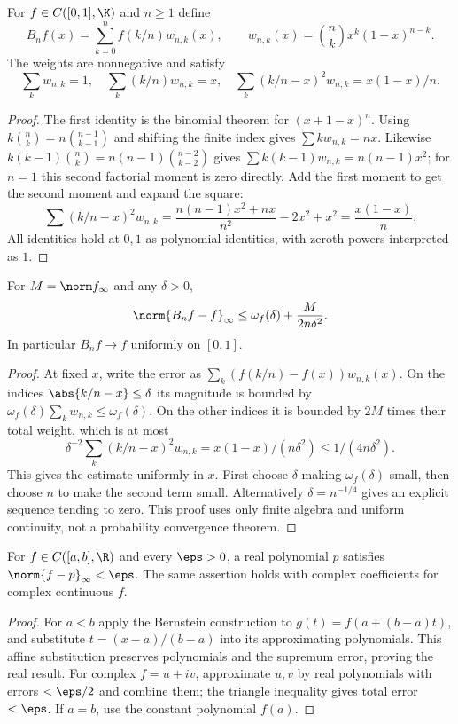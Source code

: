 \begin{construction}
For $f\in C([0,1],\K)$ and $n\geq1$ define
\[B_nf(x)=\sum_{k=0}^nf(k/n)w_{n,k}(x),\qquad w_{n,k}(x)=\binom nkx^k(1-x)^{n-k}.\]
The weights are nonnegative and satisfy
\[\sum_kw_{n,k}=1,\quad\sum_k(k/n)w_{n,k}=x,\quad\sum_k(k/n-x)^2w_{n,k}=x(1-x)/n.\]
\end{construction}
\begin{proof}
The first identity is the binomial theorem for $(x+1-x)^n$. Using $k\binom nk=n\binom{n-1}{k-1}$ and shifting the finite index gives $\sum k w_{n,k}=nx$. Likewise $k(k-1)\binom nk=n(n-1)\binom{n-2}{k-2}$ gives $\sum k(k-1)w_{n,k}=n(n-1)x^2$; for $n=1$ this second factorial moment is zero directly. Add the first moment to get the second moment and expand the square:
\[\sum(k/n-x)^2w_{n,k}=\frac{n(n-1)x^2+nx}{n^2}-2x^2+x^2=\frac{x(1-x)}n.\]
All identities hold at $0,1$ as polynomial identities, with zeroth powers interpreted as $1$.
\end{proof}

\begin{theorem}
For $M=\norm f_\infty$ and any $\delta>0$,
\[\norm{B_nf-f}_\infty\leq\omega_f(\delta)+\frac{M}{2n\delta^2}.\]
In particular $B_nf\to f$ uniformly on $[0,1]$.
\end{theorem}
\begin{proof}
At fixed $x$, write the error as $\sum_k(f(k/n)-f(x))w_{n,k}(x)$. On the indices $\abs{k/n-x}\leq\delta$ its magnitude is bounded by $\omega_f(\delta)\sum_kw_{n,k}\leq\omega_f(\delta)$. On the other indices it is bounded by $2M$ times their total weight, which is at most
\[\delta^{-2}\sum_k(k/n-x)^2w_{n,k}=x(1-x)/(n\delta^2)\leq1/(4n\delta^2).\]
This gives the estimate uniformly in $x$. First choose $\delta$ making $\omega_f(\delta)$ small, then choose $n$ to make the second term small. Alternatively $\delta=n^{-1/4}$ gives an explicit sequence tending to zero. This proof uses only finite algebra and uniform continuity, not a probability convergence theorem.
\end{proof}

\begin{theorem}
For $f\in C([a,b],\R)$ and every $\eps>0$, a real polynomial $p$ satisfies $\norm{f-p}_\infty<\eps$. The same assertion holds with complex coefficients for complex continuous $f$.
\end{theorem}
\begin{proof}
For $a<b$ apply the Bernstein construction to $g(t)=f(a+(b-a)t)$, and substitute $t=(x-a)/(b-a)$ into its approximating polynomials. This affine substitution preserves polynomials and the supremum error, proving the real result. For complex $f=u+iv$, approximate $u,v$ by real polynomials with errors $<\eps/2$ and combine them; the triangle inequality gives total error $<\eps$. If $a=b$, use the constant polynomial $f(a)$.
\end{proof}

